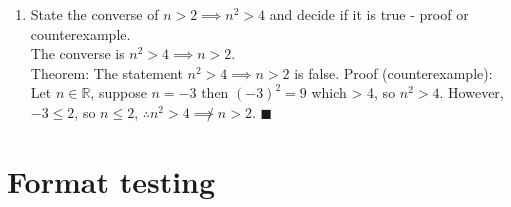 \documentclass{article}
\begin{document}
\begin{enumerate}
  \item State the converse of $n > 2 \implies n^{2} > 4$ and decide if it is true - proof or counterexample. \\
    The converse is $n^{2} > 4 \implies n > 2$.\\
    Theorem: The statement $n^{2} > 4 \implies n > 2 $ is false. 
    Proof (counterexample): Let $n \in \mathbb{R}$, suppose $n = -3$ then $(-3)^{2} = 9$ which > 4, so $n^{2} > 4$.
    However, $-3 \le 2$, so $n \le 2$, $\therefore n^{2} > 4 \not \implies n > 2$. $\blacksquare$


\end{enumerate}

\section{Format testing}
\end{document}
